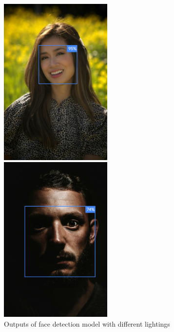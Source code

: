 \begin{figure}[ht]
	\centering
	\begin{minipage}{0.5\textwidth}
		\centering
		\includegraphics[width=0.5\textwidth]{images/face_detection_good.png}
	\end{minipage}%
	\begin{minipage}{0.5\textwidth}
		\centering
		\includegraphics[width=0.5\textwidth]{images/face_detection.png}
	\end{minipage}
	\caption{Outputs of face detection model with different lightings}
	\label{fig:face_detections} %
\end{figure}


